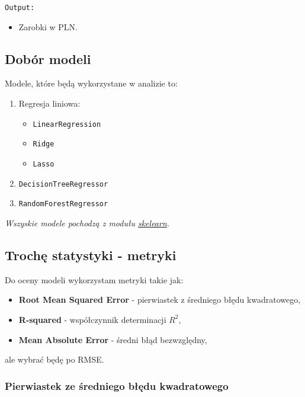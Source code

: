 \documentclass[a4paper]{article}
\begin{document}
\texttt{Output:}

\begin{itemize}
    \item Zarobki w PLN.
\end{itemize}


\subsection{Dobór modeli}

\quad Modele, które będą wykorzystane w analizie to:

\begin{enumerate}
    \item Regresja liniowa:
          \begin{itemize}
              \item \texttt{LinearRegression}
              \item \texttt{Ridge}
              \item \texttt{Lasso}
          \end{itemize}
    \item \texttt{DecisionTreeRegressor}
    \item \texttt{RandomForestRegressor}
\end{enumerate}

\textit{Wszyskie modele pochodzą z modułu \href{https://scikit-learn.org/stable/}{skelearn}.}

\subsection{Trochę statystyki - metryki}

\quad Do oceny modeli wykorzystam metryki takie jak:

\begin{itemize}
    \item \textbf{Root Mean Squared Error} - pierwiastek z średniego błędu kwadratowego,
    \item \textbf{R-squared} - współczynnik determinacji $R^2$,
    \item \textbf{Mean Absolute Error} - średni błąd bezwzględny,
\end{itemize}

\quad ale wybrać będę po RMSE.

\subsubsection{Pierwiastek ze średniego błędu kwadratowego}
\end{document}
